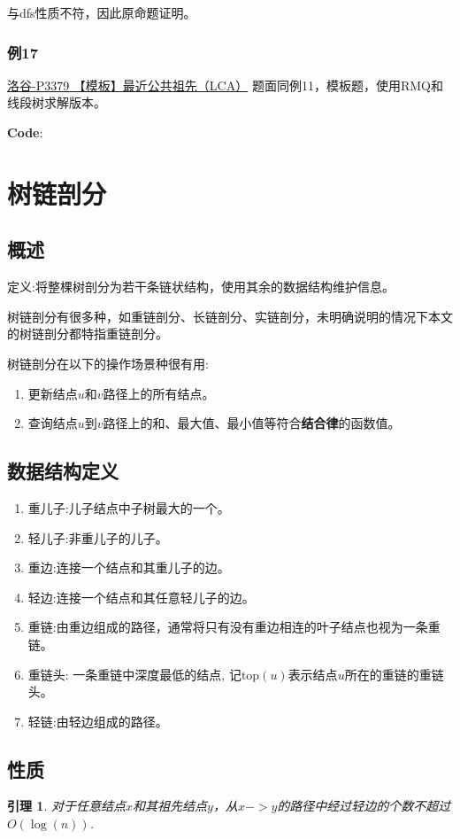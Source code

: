 \documentclass{article}
\newtheorem{lemma}{引理}
\renewcommand{\top}{\text{top}}
\newcommand{\inputcppfile}[1]{}
\begin{document}
与dfs性质不符，因此原命题证明。

\subsubsection{例17}
\href{https://www.luogu.com.cn/problem/P3379}{洛谷-P3379 【模板】最近公共祖先（LCA）}
题面同例11，模板题，使用RMQ和线段树求解版本。

\textbf{Code}:
\inputcppfile{Code_17.cpp}

\section{树链剖分}
\subsection{概述}

定义:将整棵树剖分为若干条链状结构，使用其余的数据结构维护信息。

树链剖分有很多种，如重链剖分、长链剖分、实链剖分，未明确说明的情况下本文的树链剖分都特指重链剖分。

树链剖分在以下的操作场景种很有用:
\begin{enumerate}
    \item 更新结点$u$和$v$路径上的所有结点。
    \item 查询结点$u$到$v$路径上的和、最大值、最小值等符合\textbf{结合律}的函数值。
\end{enumerate}

\subsection{数据结构定义}

\begin{enumerate}
    \item 重儿子:儿子结点中子树最大的一个。
    \item 轻儿子:非重儿子的儿子。
    \item 重边:连接一个结点和其重儿子的边。
    \item 轻边:连接一个结点和其任意轻儿子的边。
    \item 重链:由重边组成的路径，通常将只有没有重边相连的叶子结点也视为一条重链。
    \item 重链头: 一条重链中深度最低的结点, 记$\top(u)$表示结点$u$所在的重链的重链头。
    \item 轻链:由轻边组成的路径。
\end{enumerate}

\subsection{性质}
\begin{lemma}
    对于任意结点$x$和其祖先结点$y$，从$x->y$的路径中经过轻边的个数不超过$O(\log(n))$.
    \label{lemma-LCA-lightEdge}
\end{lemma}
\end{document}
